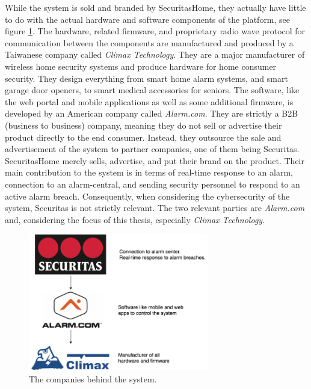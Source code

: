 While the system is sold and branded by SecuritasHome, they actually have little to do with the actual hardware and software components of the platform, see figure \ref{fig:company-structure}. The hardware, related firmware, and proprietary radio wave protocol for communication between the components are manufactured and produced by a Taiwanese company called \textit{Climax Technology}. They are a major manufacturer of wireless home security systems and produce hardware for home consumer security. They design everything from smart home alarm systems, and smart garage door openers, to smart medical accessories for seniors. The software, like the web portal and mobile applications as well as some additional firmware, is developed by an American company called \textit{Alarm.com}. They are strictly a B2B (business to business) company, meaning they do not sell or advertise their product directly to the end consumer. Instead, they outsource the sale and advertisement of the system to partner companies, one of them being Securitas. SecuritasHome merely sells, advertise, and put their brand on the product. Their main contribution to the system is in terms of real-time response to an alarm, connection to an alarm-central, and sending security personnel to respond to an active alarm breach. Consequently, when considering the cybersecurity of the system, Securitas is not strictly relevant. The two relevant parties are \textit{Alarm.com} and, considering the focus of this thesis, especially \textit{Climax Technology}.
\begin{figure}[!ht]
    \centering
    \includegraphics[width=0.7\textwidth]{images/company-structure.png}
    \caption{The companies behind the system.}
    \label{fig:company-structure}
\end{figure}

